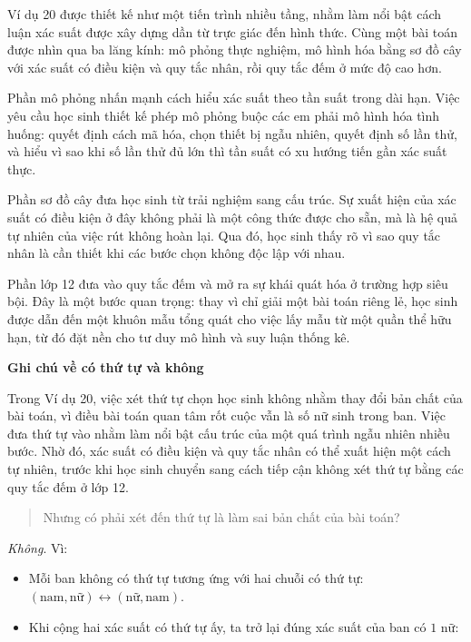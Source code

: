 \documentclass[
  10pt,
  a4paper,
  landscape,
  twoside,
  openany
]{scrbook}
\begin{document}
{
Ví dụ 20 được thiết kế như một tiến trình nhiều tầng, nhằm làm nổi bật cách luận xác suất được xây dựng dần từ trực giác đến hình thức. Cùng một bài toán được nhìn qua ba lăng kính: mô phỏng thực nghiệm, mô hình hóa bằng sơ đồ cây với xác suất có điều kiện và quy tắc nhân, rồi quy tắc đếm ở mức độ cao hơn.

Phần mô phỏng nhấn mạnh cách hiểu xác suất theo tần suất trong dài hạn. Việc yêu cầu học sinh thiết kế phép mô phỏng buộc các em phải mô hình hóa tình huống: quyết định cách mã hóa, chọn thiết bị ngẫu nhiên, quyết định số lần thử, và hiểu vì sao khi số lần thử đủ lớn thì tần suất có xu hướng tiến gần xác suất thực.

Phần sơ đồ cây đưa học sinh từ trải nghiệm sang cấu trúc. Sự xuất hiện của xác suất có điều kiện ở đây không phải là một công thức được cho sẵn, mà là hệ quả tự nhiên của việc rút không hoàn lại. Qua đó, học sinh thấy rõ vì sao quy tắc nhân là cần thiết khi các bước chọn không độc lập với nhau.

Phần lớp 12 đưa vào quy tắc đếm và mở ra sự khái quát hóa ở trường hợp siêu bội. Đây là một bước quan trọng: thay vì chỉ giải một bài toán riêng lẻ, học sinh được dẫn đến một khuôn mẫu tổng quát cho việc lấy mẫu từ một quần thể hữu hạn, từ đó đặt nền cho tư duy mô hình và suy luận thống kê.

\vspace{0.3\baselineskip}
\noindent
\textbf{Ghi chú về có thứ tự và không}

Trong Ví dụ 20, việc xét thứ tự chọn học sinh không nhằm thay đổi bản chất của bài toán, vì điều bài toán quan tâm rốt cuộc vẫn là số nữ sinh trong ban. Việc đưa thứ tự vào nhằm làm nổi bật cấu trúc của một quá trình ngẫu nhiên nhiều bước. Nhờ đó, xác suất có điều kiện và quy tắc nhân có thể xuất hiện một cách tự nhiên, trước khi học sinh chuyển sang cách tiếp cận không xét thứ tự bằng các quy tắc đếm ở lớp 12.

\begin{quote}
  Nhưng có phải xét đến thứ tự là làm sai bản chất của bài toán?
\end{quote}

\vspace{0.3\baselineskip}
\noindent
\emph{Không}. Vì:

\begin{itemize}
  \item Mỗi ban không có thứ tự tương ứng với hai chuỗi có thứ tự: $(\text{nam}, \text{nữ}) \leftrightarrow (\text{nữ}, \text{nam})$.
  \item Khi cộng hai xác suất có thứ tự ấy, ta trở lại đúng xác suất của ban có $1$ nữ:


\end{itemize}}
\end{document}
